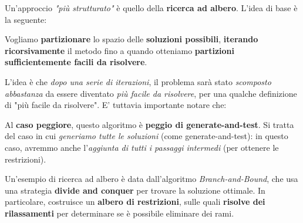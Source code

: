 Un'approccio \textit{"più strutturato"} è quello della \textbf{ricerca ad albero}.
L'idea di base è la seguente:

\begin{definition}
    Vogliamo \textbf{partizionare} lo spazio delle \textbf{soluzioni possibili},
    \textbf{iterando ricorsivamente} il metodo fino a quando otteniamo
    \textbf{partizioni sufficientemente facili da risolvere}.
\end{definition}

L'idea è che \textit{dopo una serie di iterazioni}, il problema sarà stato
\textit{scomposto abbastanza} da essere diventato \textit{più facile da risolvere},
per una qualche definizione di "più facile da risolvere". E' tuttavia 
importante notare che:

\begin{warn}
    Al \textbf{caso peggiore}, questo algoritmo è \textbf{peggio di generate-and-test}.
    Si tratta del caso in cui \textit{generiamo tutte le soluzioni} (come generate-and-test): in
    questo caso, avremmo anche l'\textit{aggiunta di tutti i passaggi intermedi} (per ottenere
    le restrizioni).
\end{warn}

Un'esempio di ricerca ad albero è data dall'algoritmo \textit{Branch-and-Bound}, che
usa una strategia \textbf{divide and conquer} per trovare la soluzione ottimale.
In particolare, costruisce un \textbf{albero di restrizioni}, sulle quali \textbf{risolve
dei rilassamenti} per determinare se è possibile eliminare dei rami.

